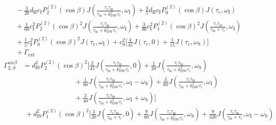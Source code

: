 \begin{appendixtext}
\begin{equation*}
\begin{split}
&\hspace{4pt}- \frac{3}{20} d_{\text{II}}c_{\text{I}}P_2^{(2)}(\cos\beta) J\left(\frac{\tau_{\text{c}}\tau_{\text{m}}}{\tau_{\text{m}}+k_{\text{DW}}^2\tau_{\text{c}}},\omega_{\text{I}}\right)+ \frac{3}{5} d_{\text{II}}c_{\text{I}}P_0^{(2)}(\cos\beta) J\left(\tau_{\text{c}},\omega_{\text{I}}\right) \\ 
&\hspace{4pt}+\frac{1}{60} c_{\text{I}}^2P_2^{(2)}(\cos\beta)^2 J\left(\frac{\tau_{\text{c}}\tau_{\text{m}}}{\tau_{\text{m}}+k_{\text{DW}}^2\tau_{\text{c}}},\omega_{\text{I}}\right)+\frac{3}{80} c_{\text{I}}^2P_1^{(2)}(\cos\beta)^2 J\left(\frac{\tau_{\text{c}}\tau_{\text{m}}}{\tau_{\text{m}}+\tau_{\text{c}}},\omega_{\text{I}}\right) \\
&\hspace{4pt}+\frac{1}{5} c_{\text{I}}^2P_0^{(2)}(\cos\beta)^2J\left(\tau_{\text{c}},\omega_{\text{I}}\right)+c_{\text{S}}^2\bigg[\frac{4}{45}J\left(\tau_{\text{c}},0\right)+\frac{1}{15}J(\tau_{\text{c}},\omega_{\text{S}})\bigg] \\
&\hspace{4pt} +\Gamma_{\text{ext}}
\end{split}
\end{equation*}
\begin{equation*}
\begin{split}
\Gamma_{2,S}^{\alpha\alpha\beta}&=d_{\text{IS}}^2P_2^{(2)}(\cos\beta)^2\bigg[\frac{3}{45}J\left(\frac{\tau_{\text{c}}\tau_{\text{m}}}{\tau_{\text{m}}+k_{\text{DW}}^2\tau_{\text{c}}},0\right) + \frac{1}{20}J\left(\frac{\tau_{\text{c}}\tau_{\text{m}}}{\tau_{\text{m}}+k_{\text{DW}}^2\tau_{\text{c}}},\omega_{\text{S}}\right) \\
&\hspace{90pt}+ \frac{1}{80}J\left(\frac{\tau_{\text{c}}\tau_{\text{m}}}{\tau_{\text{m}}+k_{\text{DW}}^2\tau_{\text{c}}},\omega_{\text{I}}-\omega_{\text{S}}\right)+\frac{3}{80}J\left(\frac{\tau_{\text{c}}\tau_{\text{m}}}{\tau_{\text{m}}+k_{\text{DW}}^2\tau_{\text{c}}},\omega_{\text{I}}\right) \\
&\hspace{90pt}+\frac{3}{40}J\left(\frac{\tau_{\text{c}}\tau_{\text{m}}}{\tau_{\text{m}}+k_{\text{DW}}^2\tau_{\text{c}}},\omega_{\text{I}}+\omega_{\text{S}}\right)\bigg] \\
&\hspace{4pt}+d_{\text{IS}}^2P_1^{(2)}(\cos\beta)^2\bigg[\frac{3}{20}J\left(\frac{\tau_{\text{c}}\tau_{\text{m}}}{\tau_{\text{m}}+\tau_{\text{c}}},0\right)+ \frac{9}{80}J\left(\frac{\tau_{\text{c}}\tau_{\text{m}}}{\tau_{\text{m}}+k_{\text{DW}}^2\tau_{\text{c}}},\omega_{\text{S}}\right) + \frac{9}{320}J\left(\frac{\tau_{\text{c}}\tau_{\text{m}}}{\tau_{\text{m}}+\tau_{\text{c}}},\omega_{\text{I}}-\omega_{\text{S}}\right)\\

\end{split}
\end{equation*}
\end{appendixtext}
